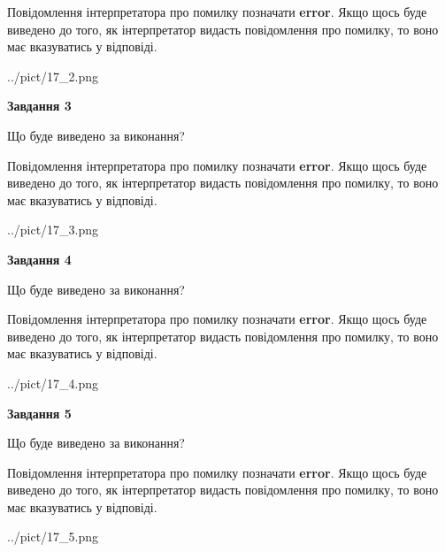 \documentclass[12pt, ukrainian]{article}
\begin{document}
{\begin {large}
Повідомлення інтерпретатора про помилку позначати \textbf{error}.
Якщо щось буде виведено до того, як інтерпретатор видасть повідомлення про помилку, 
то воно має вказуватись у відповіді. \par


\begin{center}
	{../pict/17_2.png}
\end{center}
\newpage

{\begin {center}\textbf{Завдання 3}\end {center}}\par
Що буде виведено за виконання?

Повідомлення інтерпретатора про помилку позначати \textbf{error}.
Якщо щось буде виведено до того, як інтерпретатор видасть повідомлення про помилку, 
то воно має вказуватись у відповіді. \par


\begin{center}
	{../pict/17_3.png}
\end{center}
\newpage

{\begin {center}\textbf{Завдання 4}\end {center}}\par
Що буде виведено за виконання?

Повідомлення інтерпретатора про помилку позначати \textbf{error}.
Якщо щось буде виведено до того, як інтерпретатор видасть повідомлення про помилку, 
то воно має вказуватись у відповіді. \par


\begin{center}
	{../pict/17_4.png}
\end{center}
\newpage

{\begin {center}\textbf{Завдання 5}\end {center}}\par
Що буде виведено за виконання?

Повідомлення інтерпретатора про помилку позначати \textbf{error}.
Якщо щось буде виведено до того, як інтерпретатор видасть повідомлення про помилку, 
то воно має вказуватись у відповіді. \par


\begin{center}
	{../pict/17_5.png}
\end{center}
\newpage


\end{large}}
\end{document}
